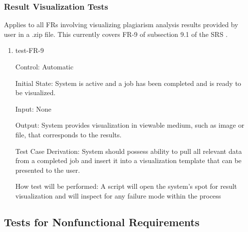 \documentclass[12pt, titlepage]{article}
\begin{document}
\subsubsection{Result Visualization Tests}

Applies to all FRs involving visualizing plagiarism analysis results provided 
by user in a .zip file. This currently covers FR-9 of subsection 9.1 of the SRS 
\citep{SRS}.

\begin{enumerate}

\item{test-FR-9\\}

Control: Automatic
					
Initial State: System is active and a job has been completed and is ready
to be visualized.
					
Input: None
					
Output: System provides visualization in viewable medium, such as image or file,
that corresponds to the results.

Test Case Derivation: System should possess ability to pull all relevant
data from a completed job and insert it into a visualization template that
can be presented to the user.

How test will be performed: A script will open the system's spot for result
visualization and will inspect for any failure mode within the process

\end{enumerate}

\subsection{Tests for Nonfunctional Requirements}



\end{document}
